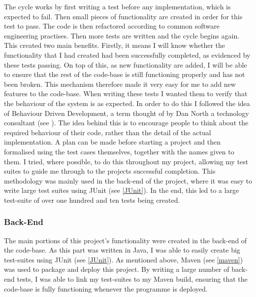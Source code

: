 The cycle works by first writing a test before any implementation, which is expected to fail. Then small pieces of functionality are created in order for this test to pass. The code is then refactored according to common software engineering practises. Then more tests are written and the cycle begins again. This created two main benefits. Firstly, it means I will know whether the functionality that I had created had been successfully completed, as evidenced by these tests passing. On top of this, as new functionality are added, I will be able to ensure that the rest of the code-base is still functioning properly and has not been broken. This mechanism therefore made it very easy for me to add new features to the code-base. When writing these tests I wanted them to verify that the behaviour of the system is as expected. In order to do this I followed the idea of Behaviour Driven Development, a term thought of by Dan North a technology consultant (see \cite{danNorth}). The idea behind this is to encourage people to think about the required behaviour of their code, rather than the detail of the actual implementation. A plan can be made before starting a project and then formalised using the test cases themselves, together with the names given to them. I tried, where possible, to do this throughout my project, allowing my test suites to guide me through to the projects successful completion. This methodology was mainly used in the back-end of the project, where it was easy to write large test suites using JUnit (see \ref{JUnit}). In the end, this led to a large test-suite of over one hundred and ten tests being created. 

\subsubsection{Back-End}
The main portions of this project's functionality were created in the back-end of the code-base. As this part was written in Java, I was able to easily create big test-suites using JUnit (see \ref{JUnit}). As mentioned above, Maven (see \ref{maven}) was used to package and deploy this project. By writing a large number of back-end tests, I was able to link my test-suites to my Maven build, ensuring that the code-base is fully functioning whenever the programme is deployed.

